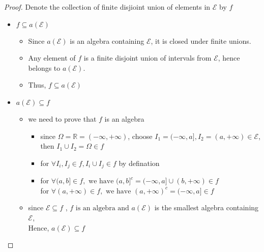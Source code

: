 \documentclass[letterpaper, 11pt]{article}
\newcommand{\1}{\mathds{1}}	%
\theoremstyle{definition}
\begin{document}
\begin{proof}
  Denote the collection of finite disjioint union of elements in $ \mathcal{E} $  by $ f $ 
  \begin{itemize}
    \item $ f \subseteq a(\mathcal{E}) $ 
    \begin{itemize}
    \item Since $a(\mathcal{E})$ is an algebra containing $\mathcal{E}$, it is closed under finite unions.
    \item Any element of $f$ is a finite disjoint union of intervals from $\mathcal{E}$, hence belongs to $a(\mathcal{E})$.
    \item Thus, $f \subseteq a(\mathcal{E})$
    \end{itemize}
    \item $ a(\mathcal{E}) \subseteq f $ 
    \begin{itemize}
    \item we need to prove that $ f  $ is an algebra
    \begin{itemize}
    \item since $\Omega =\mathbb{R}=(-\infty,+\infty)$, choose $I_1 =(-\infty,a],I_2=(a,+\infty) \in \mathcal{E}$, then $I_1\cup I_2 = \Omega \in f$
    \item for $\forall I_i,I_j\in f , I_i\cup I_j\in f $ by defination
    \item for $\forall (a,b]\in f, \text{ we have }{(a,b]}^c=(-\infty,a]\cup(b,+\infty) \in f$
    \\ for $\forall (a,+\infty)\in f, \text{ we have }(a,+\infty)^c=(-\infty,a] \in f$
    \end{itemize}
    \item since $ \mathcal{E}\subseteq f $ , $f\text{ is an algebra and } a(\mathcal{E}) $ is the smallest algebra containing $ \mathcal{E} $, \\
    Hence, $ a(\mathcal{E}) \subseteq f $
    \end{itemize}
    \end{itemize}
\end{proof}
\end{document}
